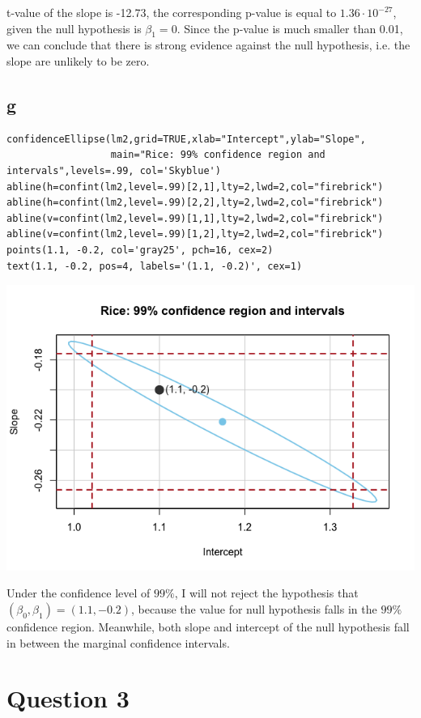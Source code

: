 \documentclass[11pt,letterpaper]{article}
\begin{document}
\noindent t-value of the slope is -12.73, the corresponding p-value is equal to $1.36 \cdot 10^{-27}$, given the null hypothesis is $\beta_1 = 0$. Since the p-value is much smaller than 0.01, we can conclude that there is strong evidence against the null hypothesis, i.e. the slope are unlikely to be zero. 

\subsection*{g}
\begin{verbatim}
confidenceEllipse(lm2,grid=TRUE,xlab="Intercept",ylab="Slope",
                  main="Rice: 99% confidence region and intervals",levels=.99, col='Skyblue')
abline(h=confint(lm2,level=.99)[2,1],lty=2,lwd=2,col="firebrick")
abline(h=confint(lm2,level=.99)[2,2],lty=2,lwd=2,col="firebrick")
abline(v=confint(lm2,level=.99)[1,1],lty=2,lwd=2,col="firebrick")
abline(v=confint(lm2,level=.99)[1,2],lty=2,lwd=2,col="firebrick")
points(1.1, -0.2, col='gray25', pch=16, cex=2)
text(1.1, -0.2, pos=4, labels='(1.1, -0.2)', cex=1)
\end{verbatim}

\includegraphics[scale=0.6]{2-g-1.png}

\noindent Under the confidence level of $99 \%$, I will not reject the hypothesis that $(\beta_0, \beta_1) = (1.1, -0.2)$, because the value for null hypothesis falls in the $99 \%$ confidence region. Meanwhile, both slope and intercept of the null hypothesis fall in between the marginal confidence intervals. 

\newpage
\section*{Question 3}
\end{document}
